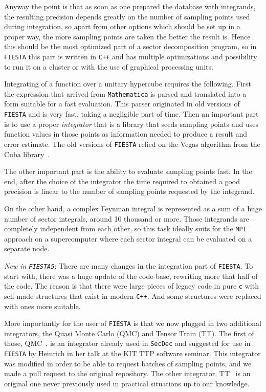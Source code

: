 \documentclass[preprint,12pt]{elsarticle}
\begin{document}
Anyway the point is that as soon as one prepared the database with integrands, the resulting precision depends greatly on the number of sampling points used during integration, so apart from other options which should be set up in a proper way, the more sampling points are taken the better the result is. Hence this should be the most optimized part of a sector decomposition program, so in {\tt FIESTA} this part is written in {\tt C++} and has multiple optimizations and possibility to run it on a cluster or with the use of graphical processing units.

Integrating of a function over a unitary hypercube requires the following. First the expression that arrived from {\tt Mathematica} is parsed and translated into a form suitable for a fast evaluation. This parser originated in old versions of {\tt FIESTA} and is very fast, taking a negligible part of time. Then an important part is to use a proper \textit{integrator} that is a library that seeds sampling points and uses function values in those points as information needed to produce a result and error estimate. The old versions of {\tt FIESTA} relied on the Vegas algorithm from the Cuba library~\cite{Hahn200578}. 

The other important part is the ability to evaluate sampling points fast. In the end, after the choice of the integrator the time required to obtained a good precision is linear to the number of sampling points requested by the integrand.

On the other hand, a complex Feynman integral is represented as a sum of a huge number of sector integrals, around 10 thousand or more. Those integrands are completely independent from each other, so this task ideally suits for the {\tt MPI} approach on a supercomputer where each sector integral can be evaluated on a separate node.

\textit{New in {\tt FIESTA5}}: There are many changes in the integration part of {\tt FIESTA}. To start with, there was a huge update of the code-base, rewriting more that half of the code. The reason is that there were large pieces of legacy code in pure {\tt c} with self-made structures that exist in modern {\tt C++}. And some structures were replaced with ones more suitable.

More importantly for the user of {\tt FIESTA} is that we now plugged in two additional integrators, the Quasi Monte Carlo (QMC) and Tensor Train (TT). The first of those, QMC~\cite{BOROWKA2019120}, is an integrator already used in {\tt SecDec} and suggested for use in {\tt FIESTA} by Heinrich in her talk at the KIT TTP software seminar. This integrator was modified in order to be able to request batches of sampling points, and we made a pull request to the original repository. The other integrator, TT~\cite{Vysotsky2021} is an original one never previously used in practical situations up to our knowledge.
\end{document}
